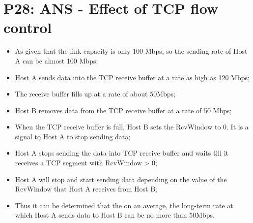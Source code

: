 \documentclass[12pt,a4paper]{article}
\begin{document}
\section*{P28: ANS - Effect of TCP flow control}
\begin{itemize}
    \item  As given that the link capacity is only 100 Mbps, so the sending rate of Host A can be almost 100 Mbps;
    \item  Host A sends data into the TCP receive buffer at a rate as high as 120 Mbps;
    \item The receive buffer fills up at a rate of about 50Mbps;
    \item Host B removes data from the TCP receive buffer at a rate of 50 Mbps;
    \item When the TCP receive buffer is full, Host B sets the RcvWindow to 0. It is a signal to Host A to stop sending data;
    \item  Host A stops sending the data into TCP receive buffer and waits till it receives a TCP segment with RcvWindow > 0;
    \item Host A will stop and start sending data depending on the value of the RcvWindow that Host A receives from Host B;
    \item Thus it can be determined that the on an average, the long-term rate at which Host A sends data to Host B can be no more than 50Mbps.
\end{itemize}
\end{document}
